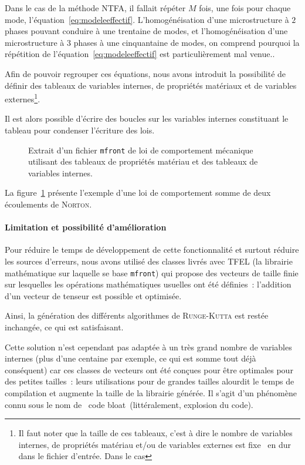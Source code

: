 \documentclass[rectoverso,pleiades,pstricks,leqno,anti]{texmf/note_technique_2010}
\newcommand{\mfront}{\texttt{mfront}}
\newcommand{\code}[1]{
  \psframebox[linecolor=ceaorange,shadow=true,blur=true]{
    \begin{minipage}[htbp]{1.0\linewidth}
      \ttfamily\scriptsize #1
    \end{minipage}
  }
}
\begin{document}
{  Dans le cas de la méthode NTFA, il fallait répéter \(M\) fois, une
  fois pour chaque mode, l'équation~\eqref{eq:modeleeffectif}.
  L'homogénéisation d'une microstructure à \(2\) phases pouvant conduire
  à une trentaine de modes, et l'homogénéisation d'une microstructure à
  \(3\) phases à une cinquantaine de modes, on comprend pourquoi la
  répétition de l'équation~\eqref{eq:modeleeffectif} est
  particulièrement mal venue.}.

Afin de pouvoir regrouper ces équations, nous avons introduit la
possibilité de définir des tableaux de variables internes, de propriétés
matériaux et de variables externes\footnote{Il faut noter que la taille
de ces tableaux, c'est à dire le nombre de variables internes, de
propriétés matériau et/ou de variables externes est fixe \og~en
dur~\fg{} dans le fichier d'entrée. Dans le cas}.

Il est alors possible d'écrire des boucles sur les variables internes
constituant le tableau pour condenser l'écriture des lois.

\begin{figure}
  \code{\scriptsize  }
  \caption{Extrait d'un fichier \mfront{} de loi de comportement mécanique utilisant des
    tableaux de propriétés matériau et des tableaux de variables
    internes.}
  \label{2norton-rk}
\end{figure}

La figure~\ref{2norton-rk} présente l'exemple d'une loi de comportement
somme de deux écoulements de \textsc{Norton}.

\paragraph{Limitation et possibilité d'amélioration} Pour réduire le
temps de développement de cette fonctionnalité et surtout réduire les
sources d'erreurs, nous avons utilisé des classes livrés avec TFEL (la
librairie mathématique sur laquelle se base \mfront{}) qui propose des
vecteurs de taille finie sur lesquelles les opérations mathématiques
usuelles ont été définies~: l'addition d'un vecteur de tenseur est
possible et optimisée.

Ainsi, la génération des différents algorithmes de \textsc{Runge-Kutta}
est restée inchangée, ce qui est satisfaisant.

Cette solution n'est cependant pas adaptée à un très grand nombre de
variables internes (plus d'une centaine par exemple, ce qui est somme
tout déjà conséquent) car ces classes de vecteurs ont été conçues pour
être optimales pour des petites tailles~: leurs utilisations pour de
grandes tailles alourdit le temps de compilation et augmente la taille
de la librairie générée. Il s'agit d'un phénomène connu sous le nom de
\og~code bloat~\fg (littéralement, explosion du code).
\end{document}
